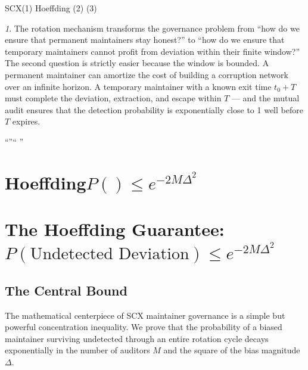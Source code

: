 \documentclass[12pt,a4paper]{article}
\theoremstyle{remark}
\newtheorem{govnote}{}[section]
\newenvironment{govbox}{%
  \begin{center}
  \color{blue}
  \begin{minipage}{0.92\textwidth}
  \begin{govnote}
}{%
  \end{govnote}
  \end{minipage}
  \end{center}
}
\begin{document}
\noindent\textbf{}
SCX(1) Hoeffding
(2) (3) 

\begin{govbox}
The rotation mechanism transforms the governance problem from ``how do we ensure
that permanent maintainers stay honest?'' to ``how do we ensure that temporary
maintainers cannot profit from deviation within their finite window?'' The second
question is strictly easier because the window is bounded. A permanent maintainer
can amortize the cost of building a corruption network over an infinite horizon.
A temporary maintainer with a known exit time $t_0 + T$ must complete the
deviation, extraction, and escape within $T$ — and the mutual audit ensures that
the detection probability is exponentially close to 1 well before $T$ expires.

\begin{center}
\small\textbf{}
“”“
”
\end{center}
\end{govbox}

\newpage

\section{Hoeffding$P(\text{}) \leq e^{-2M\Delta^2}$}
\label{sec:hoeffding}
\section{The Hoeffding Guarantee: $P(\text{Undetected Deviation}) \leq e^{-2M\Delta^2}$}

\subsection{The Central Bound}

The mathematical centerpiece of SCX maintainer governance is a simple but
powerful concentration inequality. We prove that the probability of a biased
maintainer surviving undetected through an entire rotation cycle decays
exponentially in the number of auditors $M$ and the square of the bias magnitude
$\Delta$.
\end{document}
